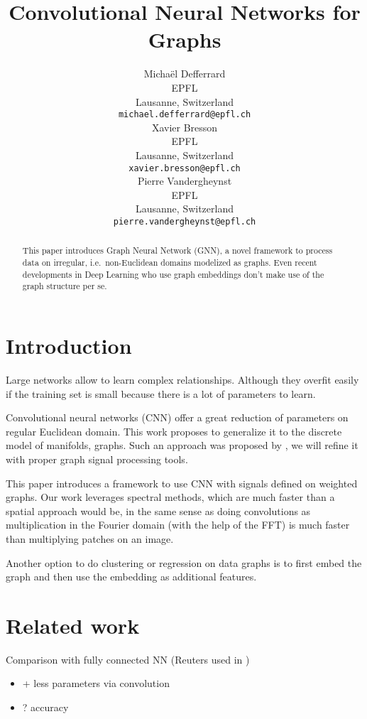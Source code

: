 \documentclass{article}
\title{Convolutional Neural Networks for Graphs}
\author{
  Michaël Defferrard \\ %
  EPFL \\
  Lausanne, Switzerland \\
  \texttt{michael.defferrard@epfl.ch} \\
  \And %
  Xavier Bresson \\
  EPFL \\
  Lausanne, Switzerland \\
  \texttt{xavier.bresson@epfl.ch} \\
  \And
  Pierre Vandergheynst \\
  EPFL \\
  Lausanne, Switzerland \\
  \texttt{pierre.vandergheynst@epfl.ch} \\
}
\begin{document}

\maketitle

\begin{abstract}
This paper introduces Graph Neural Network (GNN), a novel framework to process
data on irregular, i.e.~non-Euclidean domains modelized as graphs. Even recent
developments in Deep Learning who use graph embeddings don't make use of the
graph structure per se.
\end{abstract}

\section{Introduction}\label{introduction}

Large networks allow to learn complex relationships. Although they
overfit easily if the training set is small because there is a lot of
parameters to learn.

Convolutional neural networks (CNN) offer a great reduction of
parameters on regular Euclidean domain. This work proposes to generalize
it to the discrete model of manifolds, graphs. Such an approach was
proposed by \citep{bruna_spectral_2013, henaff_deep_2015}, we will
refine it with proper graph signal processing tools.

This paper introduces a framework to use CNN with signals defined on
weighted graphs. Our work leverages spectral methods, which are much
faster than a spatial approach would be, in the same sense as doing
convolutions as multiplication in the Fourier domain (with the help of
the FFT) is much faster than multiplying patches on an image.

Another option to do clustering or regression on data graphs is to first
embed the graph and then use the embedding as additional features.

\section{Related work}\label{related-work}

Comparison with fully connected NN (Reuters used in
\citep{srivastava_dropout_2014})

\begin{itemize}
\item
  + less parameters via convolution
\item
  ? accuracy
\end{itemize}
\end{document}
